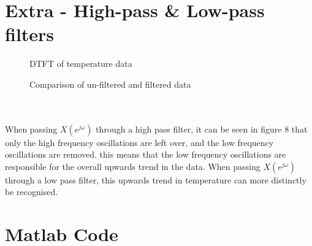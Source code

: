\documentclass[a4paper,11pt]{article}
\begin{document}
\pagebreak
\section{Extra - High-pass \& Low-pass filters}

\begin{figure}[h]
 \begin{center}
  \caption{DTFT of temperature data}
  \vspace{-20pt}
 \end{center}
\end{figure}


\begin{figure}[h]
 \begin{center}
 \vspace{-10pt}
  \caption{Comparison of un-filtered and filtered data}
  \vspace{-30pt}
 \end{center}
\end{figure}
\hfill\\
\hfill\\

When passing $X(e^{j\omega})$ through a high pass filter, it can be seen in figure 8 that only the high frequency oscillations are left over, and the low frequency oscillations are removed. this means that the low frequency oscillations are responsible for the overall upwards trend in the data. When passing $X(e^{j\omega})$ through a low pass filter, this upwards trend in temperature can more distinctly be recognised.

\pagebreak
\section*{Matlab Code}


\end{document}
